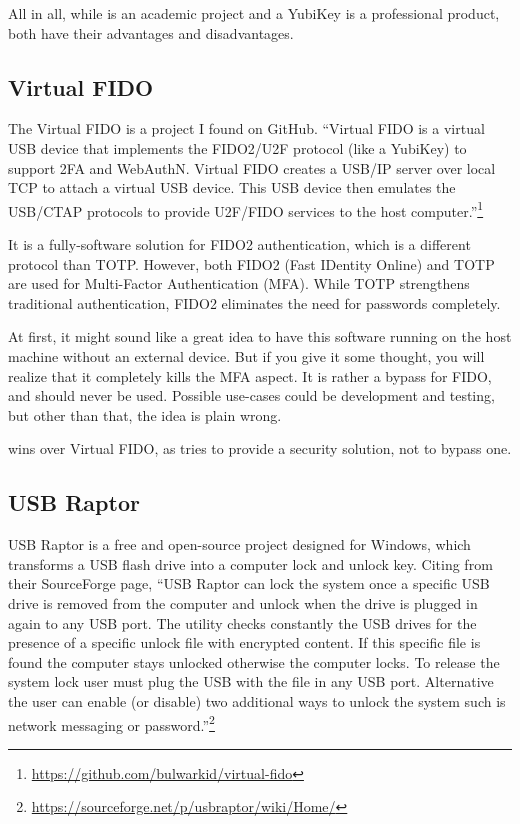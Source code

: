All in all, while \app{} is an academic project and a YubiKey is a professional product, both have their advantages and disadvantages.



\subsection{Virtual FIDO} \label{lab:ch3-virtual-fido}

The Virtual FIDO is a project I found on GitHub.
``Virtual FIDO is a virtual USB device that implements the FIDO2/U2F protocol (like a YubiKey) to support 2FA and WebAuthN.
Virtual FIDO creates a USB/IP server over local TCP to attach a virtual USB device.
This USB device then emulates the USB/CTAP protocols to provide U2F/FIDO services to the host computer.''\footnote{\url{https://github.com/bulwarkid/virtual-fido}}

It is a fully-software solution for FIDO2 authentication, which is a different protocol than TOTP.
However, both FIDO2 (Fast IDentity Online) and TOTP are used for Multi-Factor Authentication (MFA).
While TOTP strengthens traditional authentication, FIDO2 eliminates the need for passwords completely.

At first, it might sound like a great idea to have this software running on the host machine without an external device.
But if you give it some thought, you will realize that it completely kills the MFA aspect.
It is rather a bypass for FIDO, and should never be used.
Possible use-cases could be development and testing, but other than that, the idea is plain wrong.

\app{} wins over Virtual FIDO, as \app{} tries to provide a security solution, not to bypass one.



\subsection{USB Raptor} \label{lab:ch3-usb-raptor}

USB Raptor is a free and open-source project designed for Windows, which transforms a USB flash drive into a computer lock and unlock key.
Citing from their SourceForge page, ``USB Raptor can lock the system once a specific USB drive is removed from the computer and unlock when the drive is plugged in again to any USB port.
The utility checks constantly the USB drives for the presence of a specific unlock file with encrypted content.
If this specific file is found the computer stays unlocked otherwise the computer locks.
To release the system lock user must plug the USB with the file in any USB port.
Alternative the user can enable (or disable) two additional ways to unlock the system such is network messaging or password.''\footnote{\url{https://sourceforge.net/p/usbraptor/wiki/Home/}}

